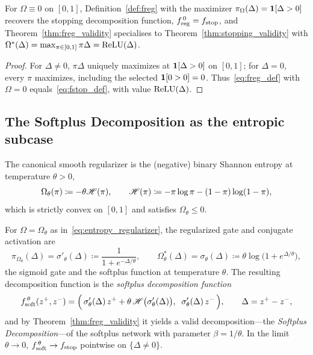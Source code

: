 \begin{corollary}\label{cor:freg_stop}
For $\Omega \equiv 0$ on $[0,1]$, Definition~\ref{def:freg} with the maximizer $\pi_\Omega(\Delta) = \1[\Delta > 0]$ recovers the stopping decomposition function, $\freg[0] = \fstop$, and Theorem~\ref{thm:freg_validity} specialises to Theorem~\ref{thm:stopping_validity} with $\Omega^*(\Delta) = \max_{\pi \in [0,1]} \pi\Delta = \relu(\Delta)$.\end{corollary}

\begin{proof}
For $\Delta\neq0$, $\pi\Delta$ uniquely maximizes at $\1[\Delta>0]$ on $[0,1]$; for $\Delta=0$, every $\pi$ maximizes, including the selected $\1[0>0]=0$. Thus~\eqref{eq:freg_def} with $\Omega=0$ equals~\eqref{eq:fstop_def}, with value $\relu(\Delta)$.
\end{proof}

\subsection{The Softplus Decomposition as the entropic subcase}\label{subsec:softplus_decomposition}

The canonical smooth regularizer is the (negative) binary Shannon entropy at temperature $\theta > 0$,
\begin{equation}
	\Omega_\theta(\pi) \coloneqq -\theta \Entropy(\pi),
	\qquad
	\Entropy(\pi) \coloneqq -\pi \log \pi - (1 - \pi) \log(1 - \pi),
	\label{eq:entropy_regularizer}
\end{equation}
which is strictly convex on $[0,1]$ and satisfies $\Omega_\theta \le 0$.

\begin{corollary}\label{cor:fsoft}
For $\Omega = \Omega_\theta$ as in~\eqref{eq:entropy_regularizer}, the regularized gate and conjugate activation are
\begin{equation}
	\pi_{\Omega_\theta}(\Delta) = \sigma'_\theta(\Delta) \coloneqq \frac{1}{1 + e^{-\Delta/\theta}},
	\qquad
	\Omega_\theta^*(\Delta) = \sigma_\theta(\Delta) \coloneqq \theta \log\bigl( 1 + e^{\Delta/\theta} \bigr),
	\label{eq:sigmoid_gate}
\end{equation}
the sigmoid gate and the softplus function at temperature $\theta$. The resulting decomposition function is the \emph{softplus decomposition function}
\begin{equation}
	\fsoft(z^+, z^-) = \Bigl(\, \sigma'_\theta(\Delta)\, z^+ + \theta\, \Entropy\bigl(\sigma'_\theta(\Delta)\bigr), \;\; \sigma'_\theta(\Delta)\, z^- \,\Bigr),
	\qquad
	\Delta = z^+ - z^-,
	\label{eq:fsoft_def}
\end{equation}
and by Theorem~\ref{thm:freg_validity} it yields a valid decomposition---the \emph{Softplus Decomposition}---of the softplus network with parameter $\beta = 1/\theta$. In the limit $\theta \to 0$, $\fsoft \to \fstop$ pointwise on $\{\Delta \neq 0\}$.\end{corollary}

